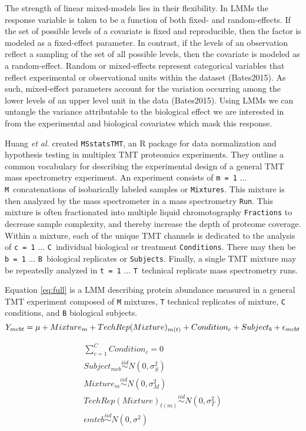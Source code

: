 \documentclass[11pt]{elife}\usepackage[]{graphicx}\usepackage[]{color}
\begin{document}
The strength of linear mixed-models lies in their flexibility. In LMMs 
the response variable is taken to be a function of both fixed- and random-effects. 
If the set of possible levels of a covariate is fixed and reproducible, then the
factor is modeled as a fixed-effect parameter.  In contrast, if the levels of an
observation reflect a sampling of the set of all possible levels, then the
covariate is modeled as a random-effect.  Random or mixed-effects represent
categorical variables that reflect experimental or observational units within
the dataset (Bates2015).  As such, mixed-effect parameters account for the
variation occurring among the lower levels of an upper level unit in the data
(Bates2015).  Using LMMs we can untangle the variance attributable to the
biological effect we are interested in from the experimental and biological
covariates which mask this response.

Huang \textit{et al.} created \texttt{MSstatsTMT}, an R package for data
normalization and hypothesis testing in multiplex TMT proteomics experiments. 
They outline a common vocabulary for describing the experimental design of 
a general TMT mass spectrometry experiment. An experiment consists of 
\texttt{m = 1} ... \texttt{M}\ concatenations of isobarically labeled samples or
\texttt{Mixtures}.  This mixture is then analyzed by the mass spectrometer in a
mass spectrometry \texttt{Run}.  This mixture is often fractionated into
multiple liquid chromotography \texttt{Fractions} to decrease sample complexity,
and thereby increase the depth of proteome coverage.  Within a mixture, each of
the unique TMT channels is dedicated to the analysis of \texttt{c = 1} ...
\texttt{C}\ individual biological or treatment \texttt{Conditions}.  There may
then be \texttt{b = 1} ... \texttt{B}\ biological replicates or
\texttt{Subjects}. Finally, a single TMT mixture may be repeatedly analyzed in
\texttt{t = 1} ... \texttt{T}\ technical replicate mass spectrometry runs.

Equation \ref{eq:full} is a LMM describing protein abundance measured in a general TMT
experiment composed of  \texttt{M} mixtures, \texttt{T} technical replicates of
mixture, \texttt{C} conditions, and \texttt{B} biological subjects.
\begin{equation} %
  \label{eq:full} 
	Y_{mcbt} = \mu + Mixture_m + TechRep(Mixture)_{m(t)} + Condition_c + 
	Subject_b + \epsilon_{mcbt}\\
\end{equation}

\begin{equation}
  \begin{gathered}
    \label{eq:constraints}
	\sum_{c=1}^{C} Condition_c = 0 \\
	Subject_{mcb} \stackrel{iid}{\sim} N(0,\sigma^2_S) \\
	Mixture_m \stackrel{iid}{\sim} N(0,\sigma^2_M) \\
	TechRep(Mixture)_{t(m)} \stackrel{iid}{\sim} N(0,\sigma^2_T) \\
	\epsilon{mtcb} \stackrel{iid}{\sim} N(0,\sigma^2) \\
  \end{gathered}
\end{equation}
\end{document}

